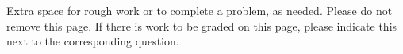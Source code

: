 \documentclass[12pt]{article}
\begin{document}
\newpage

Extra space for rough work or to complete a problem, as needed. Please do not remove this page. If there is work to be graded on this page, please indicate this next to the corresponding question.
\end{document}
